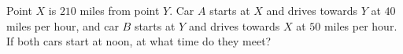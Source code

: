 Point $X$ is $210$ miles from point $Y$. Car $A$ starts at $X$ and drives towards $Y$ at $40$ miles per hour, and car $B$ starts at $Y$ and drives towards $X$ at $50$ miles per hour. If both cars start at noon, at what time do they meet?
